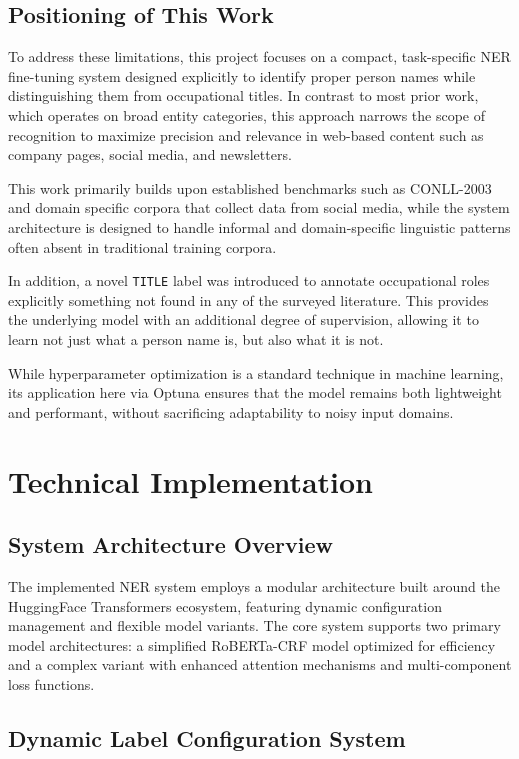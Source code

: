 \documentclass[a4paper]{usiinfbachelorproject}
\begin{document}
\subsection{Positioning of This Work}

To address these limitations, this project focuses on a compact, task-specific NER fine-tuning system designed explicitly to identify proper person names while distinguishing them from occupational titles. In contrast to most prior work, which operates on broad entity categories, this approach narrows the scope of recognition to maximize precision and relevance in web-based content such as company pages, social media, and newsletters.

This work primarily builds upon established benchmarks such as CONLL-2003 and domain specific corpora that collect data from social media, while the system architecture is designed to handle informal and domain-specific linguistic patterns often absent in traditional training corpora.

In addition, a novel \texttt{TITLE} label was introduced to annotate occupational roles explicitly something not found in any of the surveyed literature. This provides the underlying model with an additional degree of supervision, allowing it to learn not just what a person name is, but also what it is not.

While hyperparameter optimization is a standard technique in machine learning, its application here via Optuna ensures that the model remains both lightweight and performant, without sacrificing adaptability to noisy input domains.

\section{\textbf{Technical Implementation}}

\subsection{System Architecture Overview}

The implemented NER system employs a modular architecture built around the HuggingFace Transformers ecosystem, featuring dynamic configuration management and flexible model variants. The core system supports two primary model architectures: a simplified RoBERTa-CRF model optimized for efficiency and a complex variant with enhanced attention mechanisms and multi-component loss functions.

\subsection{Dynamic Label Configuration System}
\end{document}
